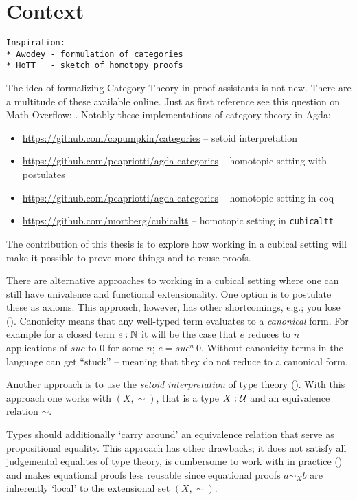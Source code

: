 \section{Context}
%
\begin{verbatim}
Inspiration:
* Awodey - formulation of categories
* HoTT   - sketch of homotopy proofs
\end{verbatim}
The idea of formalizing Category Theory in proof assistants is not new. There
are a multitude of these available online. Just as first reference see this
question on Math Overflow: \cite{mo-formalizations}. Notably these
implementations of category theory in Agda:
\begin{itemize}
\item
\url{https://github.com/copumpkin/categories} -- setoid interpretation
\item
\url{https://github.com/pcapriotti/agda-categories} -- homotopic setting with postulates
\item
\url{https://github.com/pcapriotti/agda-categories} -- homotopic setting in coq
\item
\url{https://github.com/mortberg/cubicaltt} -- homotopic setting in \texttt{cubicaltt}
\end{itemize}

The contribution of this thesis is to explore how working in a cubical setting
will make it possible to prove more things and to reuse proofs.

There are alternative approaches to working in a cubical setting where one can
still have univalence and functional extensionality. One option is to postulate
these as axioms. This approach, however, has other shortcomings, e.g.; you lose
 (\cite{huber-2016}). Canonicity means that any well-typed
term evaluates to a \emph{canonical} form. For example for a closed term $e :
\mathbb{N}$ it will be the case that $e$ reduces to $n$ applications of $\mathit{suc}$
to $0$ for some $n$; $e = \mathit{suc}^n\ 0$. Without canonicity terms in the
language can get ``stuck'' -- meaning that they do not reduce to a canonical
form.

Another approach is to use the \emph{setoid interpretation} of type theory
(\cite{hofmann-1995,huber-2016}). With this approach one works with
 $(X, \sim)$, that is a type $X \;\mathord{:}\; \mathcal{U}$ and an
equivalence relation $\sim$.

Types should additionally `carry around' an equivalence relation that serve as
propositional equality. This approach has other drawbacks; it does not satisfy
all judgemental equalites of type theory, is cumbersome to work with in practice
(\cite[p. 4]{huber-2016}) and makes equational proofs less reusable since
equational proofs $a \sim_{X} b$ are inherently `local' to the extensional set
$(X , \sim)$.
%
